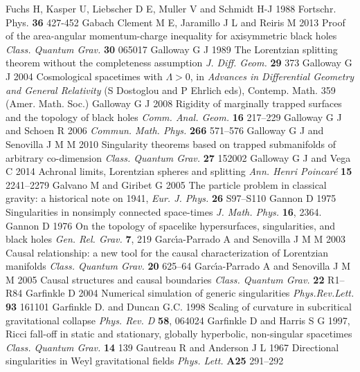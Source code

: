 \documentclass[12pt]{iopart}
\begin{document}
\begin{thebibliography}{999}
 Fuchs H, Kasper U, Liebscher D E, Muller V and Schmidt H-J 1988 Fortschr. Phys. {\bf 36} 427-452
 Gabach Clement M E, Jaramillo J L and Reiris M 2013
Proof of the area-angular momentum-charge inequality for axisymmetric black holes
{\it Class. Quantum Grav.} {\bf 30} 065017
 Galloway G J 1989 The Lorentzian splitting theorem without the completeness assumption {\it J. Diff. Geom.} {\bf 29} 373
 Galloway G J 2004 Cosmological spacetimes with $\Lambda > 0$, in {\it Advances in Differential Geometry and General Relativity} (S Dostoglou and P Ehrlich eds), Contemp. Math. 359 (Amer. Math. Soc.)%
 Galloway G J 2008 Rigidity of marginally trapped surfaces and the topology of black holes {\it Comm. Anal. Geom.} {\bf  16} 217--229
 Galloway G J and Schoen R 2006 {\it Commun. Math. Phys.} {\bf 266}
571--576
 Galloway G J and Senovilla J M M 2010 Singularity theorems based on trapped submanifolds of arbitrary co-dimension {\it Class. Quantum Grav.} {\bf 27} 152002
 Galloway G J and Vega C 2014 Achronal limits, Lorentzian spheres and splitting {\it Ann. Henri Poincar\'e} {\bf 15} 2241--2279
 Galvano M and Giribet G 2005 The particle problem in classical gravity: a historical note on 1941, {\it Eur. J. Phys.} {\bf  26}  S97--S110
 Gannon D 1975 Singularities in nonsimply connected space-times {\it J. Math. Phys.} {\bf 16}, 2364.
 Gannon D 1976 On the topology of spacelike hypersurfaces, singularities, and black holes {\it Gen. Rel. Grav.} {\bf 7}, 219
  Garc\'{\i}a-Parrado A and Senovilla J M M 2003 Causal relationship: a new tool for the causal characterization of Lorentzian manifolds {\it Class. Quantum Grav.} {\bf  20} 625--64
 Garc\'{\i}a-Parrado A and Senovilla J M M 2005 Causal structures and causal boundaries {\it Class. Quantum Grav.} {\bf 22} R1--R84
 Garfinkle D 2004 Numerical simulation of generic singularities {\it Phys.Rev.Lett.} {\bf 93}  161101
 Garfinkle D. and Duncan G.C. 1998 Scaling of curvature in subcritical gravitational collapse {\it Phys. Rev. D} {\bf 58}, 064024
 Garfinkle D and Harris S G 1997, Ricci fall-off in static and stationary, globally hyperbolic,
non-singular spacetimes {\it Class. Quantum Grav.} {\bf 14} 139%
 Gautreau R and Anderson J L 1967 Directional singularities in Weyl gravitational fields {\it Phys. Lett.} {\bf A25} 291--292%

\end{thebibliography}
\end{document}
